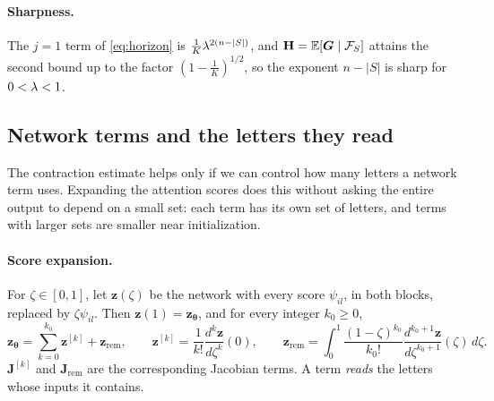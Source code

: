 \paragraph{Sharpness.}\label{rem:tight} The $j=1$ term of \cref{eq:horizon} is $\frac{1}{K}\lambda^{2(n-|S|)}$, and $\mathbf H=\mathbb E[\bm G\mid\mathcal F_S]$ attains the second bound up to the
factor $(1-\frac{1}{K})^{1/2}$, so the exponent $n-|S|$ is sharp for $0<\lambda<1$.

\subsection{Network terms and the letters they read}
\label{app:model-spectrum}

The contraction estimate helps only if we can control how many letters a network term uses. Expanding the attention scores does
this without asking the entire output to depend on a small set: each term has its own set of letters, and terms with larger sets
are smaller near initialization.

\paragraph{Score expansion.} For $\zeta\in[0,1]$, let $\bm z(\zeta)$ be the network with every score $\psi_{il}$, in both blocks, replaced by
$\zeta\psi_{il}$. Then $\bm z(1)=\bm z_{\bm\theta}$, and for every integer $k_0\ge0$,
\begin{equation}
 \bm z_{\bm\theta}=\sum_{k=0}^{k_0}\bm z^{[k]}+\bm z_{\mathrm{rem}},\qquad
 \bm z^{[k]}=\frac{1}{k!}\frac{d^k\bm z}{d\zeta^k}(0),\qquad
 \bm z_{\mathrm{rem}}=\int_0^1\frac{(1-\zeta)^{k_0}}{k_0!}\frac{d^{k_0+1}\bm z}{d\zeta^{k_0+1}}(\zeta)\,d\zeta .
 \label{eq:score-split}
\end{equation}
$\mathbf J^{[k]}$ and $\mathbf J_{\mathrm{rem}}$ are the corresponding Jacobian terms. A term \emph{reads} the letters whose inputs it contains.

